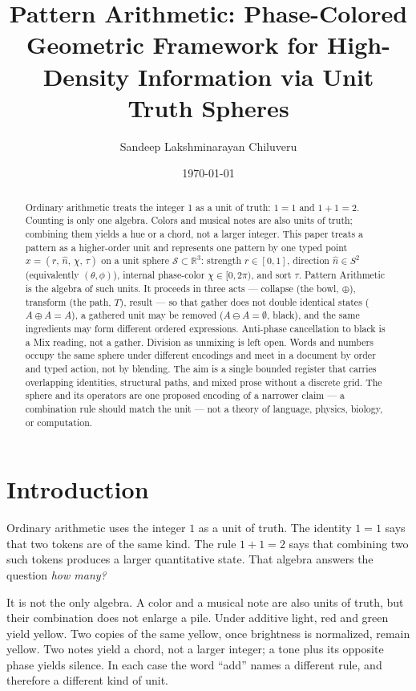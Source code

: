 \documentclass[12pt, a4paper]{article}
\title{Pattern Arithmetic: Phase-Colored Geometric Framework for High-Density Information via Unit Truth Spheres}
\author{Sandeep Lakshminarayan Chiluveru}
\date{\today}
\begin{document}
\maketitle

\begin{abstract}
Ordinary arithmetic treats the integer 1 as a unit of truth: $1=1$ and $1+1=2$. Counting is only one algebra. Colors and musical notes are also units of truth; combining them yields a hue or a chord, not a larger integer. This paper treats a pattern as a higher-order unit and represents one pattern by one typed point
$x = (r,\,\hat n,\,\chi,\,\tau)$
on a unit sphere $\mathcal{S} \subset \mathbb{R}^3$:
strength $r \in [0, 1]$,
direction $\hat n \in S^2$ (equivalently $(\theta,\phi)$),
internal phase-color $\chi \in [0, 2\pi)$,
and sort $\tau$.
Pattern Arithmetic is the algebra of such units. It proceeds in three acts --- collapse (the bowl, $\oplus$), transform (the path, $T$), result --- so that gather does not double identical states ($A \oplus A = A$), a gathered unit may be removed ($A \ominus A = \emptyset$, black), and the same ingredients may form different ordered expressions. Anti-phase cancellation to black is a Mix reading, not a gather. Division as unmixing is left open. Words and numbers occupy the same sphere under different encodings and meet in a document by order and typed action, not by blending. The aim is a single bounded register that carries overlapping identities, structural paths, and mixed prose without a discrete grid. The sphere and its operators are one proposed encoding of a narrower claim --- a combination rule should match the unit --- not a theory of language, physics, biology, or computation.
\end{abstract}

\section{Introduction}

Ordinary arithmetic uses the integer $1$ as a unit of truth.
The identity $1=1$ says that two tokens are of the same kind.
The rule $1+1=2$ says that combining two such tokens produces a
larger quantitative state. That algebra answers the question
\emph{how many?}

It is not the only algebra. A color and a musical note are also
units of truth, but their combination does not enlarge a pile.
Under additive light, red and green yield yellow. Two copies of
the same yellow, once brightness is normalized, remain yellow.
Two notes yield a chord, not a larger integer; a tone plus its
opposite phase yields silence. In each case the word ``add''
names a different rule, and therefore a different kind of unit.
\end{document}
